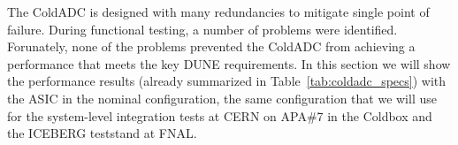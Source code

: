\label{sec:4.}


The ColdADC is designed with many redundancies to mitigate single point of failure. During functional testing, a number of 
problems were identified. Forunately, none of the problems prevented the ColdADC from achieving a performance that meets 
the key DUNE requirements. In this section we will show the performance results (already summarized 
in Table~\ref{tab:coldadc_specs}) with the ASIC in the nominal configuration, the same configuration that we will 
use for the system-level integration tests at CERN on APA\#7 in the Coldbox and the ICEBERG teststand at FNAL.
